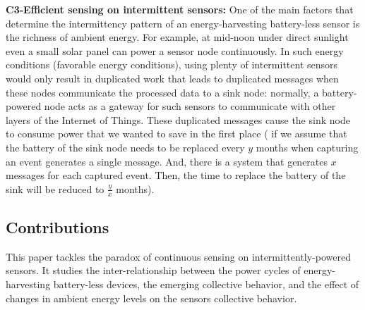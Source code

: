 \noindent\textbf{C3-Efficient sensing on intermittent sensors:} 
One of the main factors that determine the intermittency pattern of an energy-harvesting battery-less sensor is the richness of ambient energy. For example, at mid-noon under direct sunlight even a small solar panel can power a sensor node continuously. 
In such energy conditions (favorable energy conditions), using plenty of intermittent sensors would only result in duplicated work that leads to duplicated messages when these nodes communicate the processed data to a sink node: normally, a battery-powered node acts as a gateway for such sensors to communicate with other layers of the Internet of Things. These duplicated messages cause the sink node to consume power that we wanted to save in the first place (
if we assume that the battery of the sink node needs to be replaced every $y$ months when capturing an event generates a single message. And,  there is a system that generates $x$ messages for each captured event. Then, the time to replace the battery of the sink will be reduced to  $\frac{y}{x}$ months).






\subsection{Contributions}
%
This paper tackles the paradox of continuous sensing on intermittently-powered sensors. 
It studies the inter-relationship between the power cycles of energy-harvesting battery-less devices, 
the emerging collective behavior, and the effect of changes in ambient energy levels on the sensors collective behavior. 



